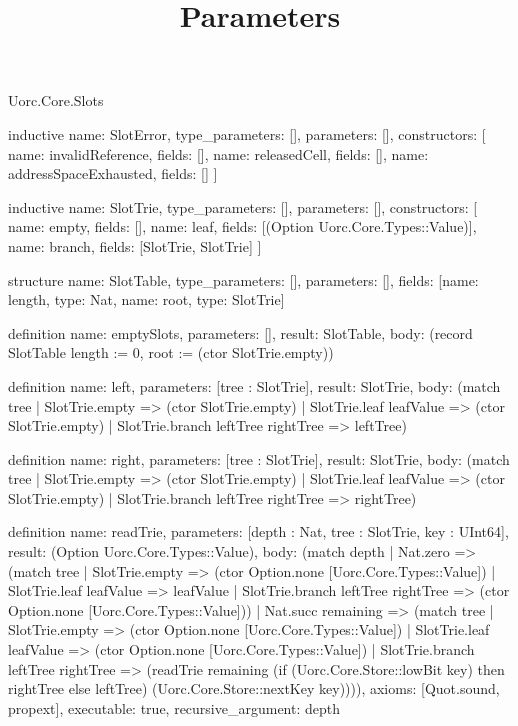 \begin{lexlean}{Uorc.Core.Slots}
\title{Parameters}
\begin{semanticmodule}
inductive{
  name: SlotError,
  type_parameters: [],
  parameters: [],
  constructors: [
    {name: invalidReference, fields: []},
    {name: releasedCell, fields: []},
    {name: addressSpaceExhausted, fields: []}
  ]
}

inductive{
  name: SlotTrie,
  type_parameters: [],
  parameters: [],
  constructors: [
    {name: empty, fields: []},
    {name: leaf, fields: [(Option Uorc.Core.Types::Value)]},
    {name: branch, fields: [SlotTrie, SlotTrie]}
  ]
}

structure{
  name: SlotTable,
  type_parameters: [],
  parameters: [],
  fields: [{name: length, type: Nat}, {name: root, type: SlotTrie}]
}

definition{
  name: emptySlots,
  parameters: [],
  result: SlotTable,
  body: (record SlotTable {length := 0, root := (ctor SlotTrie.empty)})
}

definition{
  name: left,
  parameters: [tree : SlotTrie],
  result: SlotTrie,
  body: (match tree
    | SlotTrie.empty => (ctor SlotTrie.empty)
    | SlotTrie.leaf leafValue => (ctor SlotTrie.empty)
    | SlotTrie.branch leftTree rightTree => leftTree)
}

definition{
  name: right,
  parameters: [tree : SlotTrie],
  result: SlotTrie,
  body: (match tree
    | SlotTrie.empty => (ctor SlotTrie.empty)
    | SlotTrie.leaf leafValue => (ctor SlotTrie.empty)
    | SlotTrie.branch leftTree rightTree => rightTree)
}

definition{
  name: readTrie,
  parameters: [depth : Nat, tree : SlotTrie, key : UInt64],
  result: (Option Uorc.Core.Types::Value),
  body: (match depth
    | Nat.zero => (match tree
      | SlotTrie.empty => (ctor Option.none [Uorc.Core.Types::Value])
      | SlotTrie.leaf leafValue => leafValue
      | SlotTrie.branch leftTree rightTree => (ctor Option.none [Uorc.Core.Types::Value]))
    | Nat.succ remaining => (match tree
      | SlotTrie.empty => (ctor Option.none [Uorc.Core.Types::Value])
      | SlotTrie.leaf leafValue => (ctor Option.none [Uorc.Core.Types::Value])
      | SlotTrie.branch leftTree rightTree => (readTrie remaining (if (Uorc.Core.Store::lowBit key) then rightTree else leftTree) (Uorc.Core.Store::nextKey key)))),
  axioms: [Quot.sound, propext],
  executable: true,
  recursive_argument: depth
}


\end{semanticmodule}
\end{lexlean}

